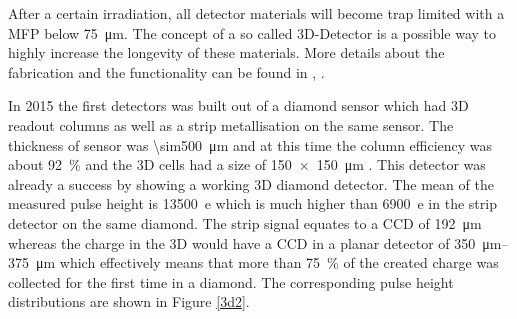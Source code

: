 After a certain irradiation, all detector materials will become trap limited with a \ac{MFP} below \SI{75}{\micro\meter}. The concept of a so called 3D-Detector is a possible way to highly increase the longevity of these materials. More details about the fabrication and the functionality can be found in \cite{3D}, \cite{parker}.\par
In 2015 the first detectors was built out of a \pcvd diamond sensor which had 3D readout 
columns as well as a strip metallisation on the same sensor. The thickness of sensor was \SI{\sim500}{\micro\meter} and at this time the column efficiency was about \SI{92}{\%} and the 3D cells had a size of \SI{150x150}{\micro\meter} \cite{felix}. This detector was already a success by showing a working 3D diamond detector. 
The mean of the measured pulse height is \SI{13500}{e} which is much higher than \SI{6900}{e} in the strip detector on the same diamond. The strip signal equates to a \ac{CCD} of \SI{192}{\micro\meter} whereas the charge in the 3D would have a \ac{CCD} in a planar detector of \SIrange{350}{375}{\micro\meter} which effectively means that more than \SI{75}{\%} of the created charge was collected for the first time in a \pcvd diamond. The corresponding pulse height distributions are shown in Figure \vref{3d2}.\par
